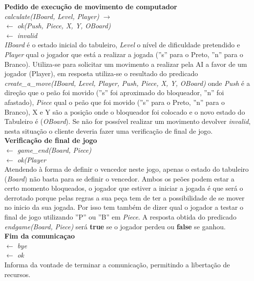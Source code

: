 \documentclass[15pt,a4paper]{article}
\begin{document}
\textbf{Pedido de execução de movimento de computador}\\
\textit{calculate(IBoard,  Level, Player)} $\rightarrow$ \\
\indent\indent\indent\indent	$\leftarrow$ \textit{ok(Push, Piece, X, Y, OBoard)}\\
\indent\indent\indent\indent	$\leftarrow$ \textit{invalid}\\
\textit{IBoard} é o estado inicial do tabuleiro,  \textit{Level} o nível de dificuldade pretendido e  \textit{Player} qual o jogador que está a realizar a jogada (''s'' para o Preto, ''n'' para o Branco).
Utiliza-se para solicitar um movimento a realizar pela AI a favor de um jogador (Player), em resposta utiliza-se o resultado do predicado \textit{create\_a\_move(IBoard, Level, Player, Push, Piece, X, Y, OBoard)} onde \textit{Push} é a direção que o peão foi movido (''s'' foi aproximado do bloqueador, ''n'' foi afastado), \textit{Piece} qual o peão que foi movido (''s'' para o Preto, ''n'' para o Branco), X e Y são a posição onde o bloqueador foi colocado e o novo estado do Tabuleiro é (\textit{OBoard}).
Se não for possível realizar um movimento devolver  \textit{invalid}, nesta situação o cliente deveria fazer uma verificação de final de jogo.\\


\textbf{Verificação de final de jogo}\\
\indent\indent\indent\indent	$\leftarrow$ \textit{game\_end(Board, Piece)}\\
\indent\indent\indent\indent	$\leftarrow$ \textit{ok(Player}\\
Atendendo à forma de definir o vencedor neste jogo, apenas o estado do tabuleiro  (\textit{Board}) não basta para se definir o vencedor. Ambos os peões podem estar a certo momento bloqueados, o jogador que estiver a iniciar a jogada é que será o derrotado porque pelas regras a sua peça tem de ter a possibilidade de se mover no inicio da sua jogada. Por isso tem também de dizer qual o jogador a testar o final de jogo utilizando ''P'' ou ''B'' em \textit{Piece}. A resposta obtida do predicado \textit{endgame(Board, Piece)} será \textbf{true} se o jogador perdeu ou \textbf{false} se ganhou.\\


\textbf{Fim da comunicaçao}\\
\indent\indent\indent\indent	$\leftarrow$ \textit{bye}\\
\indent\indent\indent\indent	$\leftarrow$ \textit{ok}\\
Informa da vontade de terminar a comunicação, permitindo a libertação de recursos.\\
\end{document}
